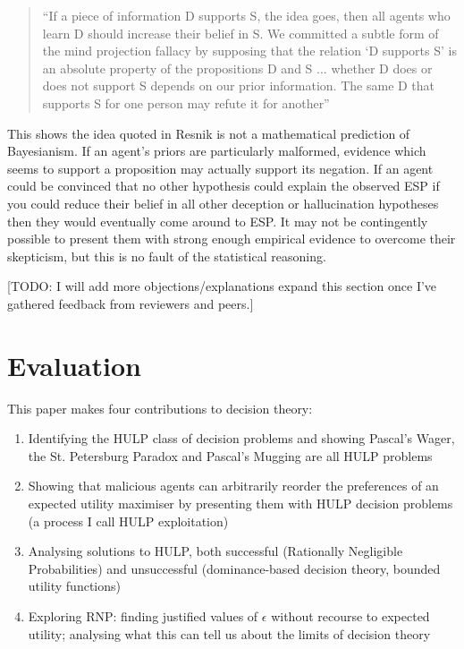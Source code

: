 \documentclass{article}
\begin{document}
\begin{quote}
``If a piece of information D supports S, the idea goes, then all agents who learn D should increase their belief in S. We committed a subtle form of the mind projection fallacy by supposing that the relation ‘D supports S’ is an absolute property of the propositions D and S ... whether D does or does not support S depends on our prior information. The same D that supports S for one person may refute it for another'' \citep[pg. 131]{jaynes2003probability}
\end{quote}

This shows the idea quoted in Resnik is not a mathematical prediction of Bayesianism. If an agent's priors are particularly malformed, evidence which seems to support a proposition may actually support its negation. If an agent could be convinced that no other hypothesis could explain the observed ESP \textemdash{} if you could reduce their belief in all other deception or hallucination hypotheses \textemdash{} then they would eventually come around to ESP. It may not be contingently possible to present them with strong enough empirical evidence to overcome their skepticism, but this is no fault of the statistical reasoning.

[TODO: I will add more objections/explanations expand this section once I've gathered feedback from reviewers and peers.]

\section{Evaluation}
This paper makes four contributions to decision theory:

\begin{enumerate}
\item Identifying the HULP class of decision problems and showing Pascal's Wager, the St. Petersburg Paradox and Pascal's Mugging are all HULP problems
\item Showing that malicious agents can arbitrarily reorder the preferences of an expected utility maximiser by presenting them with HULP decision problems (a process I call HULP exploitation)
\item Analysing solutions to HULP, both successful (Rationally Negligible Probabilities) and unsuccessful (dominance-based decision theory, bounded utility functions)
\item Exploring RNP: finding justified values of \(\epsilon\) without recourse to expected utility; analysing what this can tell us about the limits of decision theory
\end{enumerate}
\end{document}
